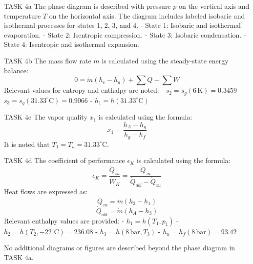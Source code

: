 TASK 4a  
The phase diagram is described with pressure \( p \) on the vertical axis and temperature \( T \) on the horizontal axis. The diagram includes labeled isobaric and isothermal processes for states 1, 2, 3, and 4.  
- State 1: Isobaric and isothermal evaporation.  
- State 2: Isentropic compression.  
- State 3: Isobaric condensation.  
- State 4: Isentropic and isothermal expansion.  

TASK 4b  
The mass flow rate \( \dot{m} \) is calculated using the steady-state energy balance:  
\[
0 = \dot{m}(h_e - h_a) + \sum \dot{Q} - \sum \dot{W}
\]  
Relevant values for entropy and enthalpy are noted:  
- \( s_2 = s_g(6 \, \text{K}) = 0.3459 \)  
- \( s_3 = s_g(31.33^\circ\text{C}) = 0.9066 \)  
- \( h_1 = h(31.33^\circ\text{C}) \)  

TASK 4c  
The vapor quality \( x_1 \) is calculated using the formula:  
\[
x_1 = \frac{h_A - h_g}{h_g - h_f}
\]  
It is noted that \( T_1 = T_u = 31.33^\circ\text{C} \).  

TASK 4d  
The coefficient of performance \( \epsilon_K \) is calculated using the formula:  
\[
\epsilon_K = \frac{\dot{Q}_{zu}}{\dot{W}_K} = \frac{\dot{Q}_{zu}}{\dot{Q}_{abl} - \dot{Q}_{zu}}
\]  
Heat flows are expressed as:  
\[
\dot{Q}_{zu} = \dot{m}(h_2 - h_1)  
\]  
\[
\dot{Q}_{abl} = \dot{m}(h_A - h_3)  
\]  
Relevant enthalpy values are provided:  
- \( h_1 = h(T_1, p_1) \)  
- \( h_2 = h(T_2, -22^\circ\text{C}) = 236.08 \)  
- \( h_3 = h(8 \, \text{bar}, T_3) \)  
- \( h_u = h_f(8 \, \text{bar}) = 93.42 \)  

No additional diagrams or figures are described beyond the phase diagram in TASK 4a.